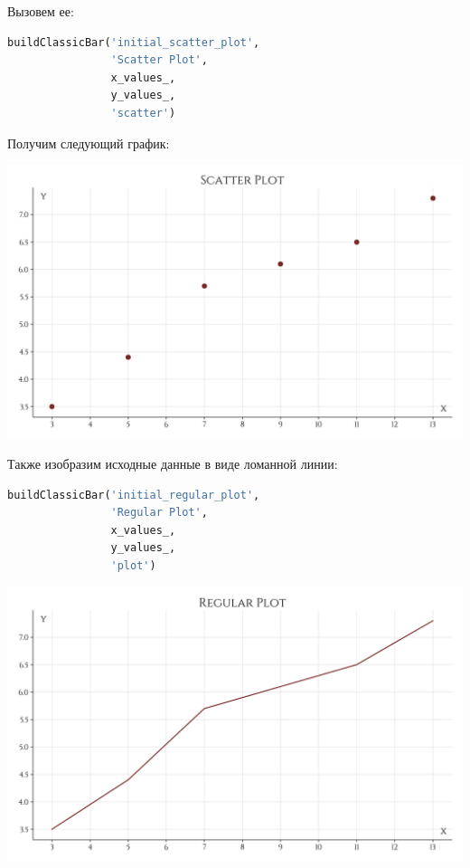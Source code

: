 \documentclass[a4paper, 14pt]{extarticle}
\begin{document}
Вызовем ее:

\begin{center}
    \begin{lstlisting}[language=Python]
buildClassicBar('initial_scatter_plot', 
                'Scatter Plot', 
                x_values_, 
                y_values_, 
                'scatter')
    \end{lstlisting}
\end{center}

Получим следующий график:

\begin{center}
    \includegraphics[width=1\textwidth, height=0.5\textheight, keepaspectratio]{initial_scatter_plot} \\
\end{center}

Также изобразим исходные данные в виде ломанной линии:

\begin{center}
    \begin{lstlisting}[language=Python]
buildClassicBar('initial_regular_plot', 
                'Regular Plot', 
                x_values_, 
                y_values_, 
                'plot')
    \end{lstlisting}
\end{center}

\begin{center}
    \includegraphics[width=1\textwidth, height=0.5\textheight, keepaspectratio]{initial_regular_plot} \\
\end{center}
\end{document}
